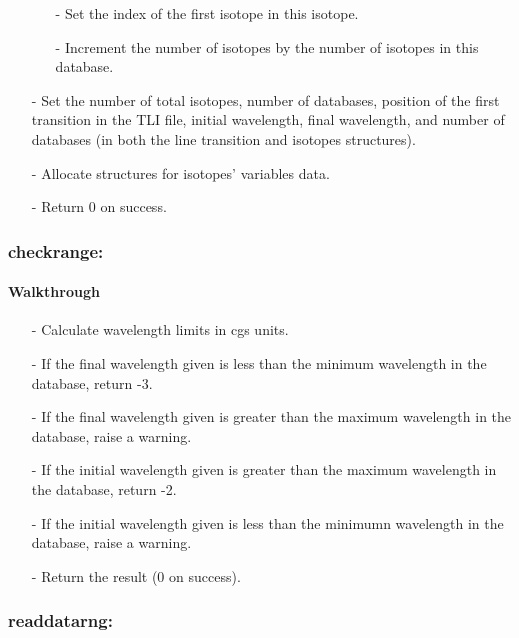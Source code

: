 \documentclass[letterpaper,12pt]{article}
\begin{document}
\begin{enumerate}[leftmargin=10pt, noitemsep, parsep=0pt, topsep=0ex]
\begin{enumerate}[leftmargin=10pt, noitemsep, parsep=0pt, topsep=0ex]
\item[-] Set the index of the first isotope in this isotope.
\item[-] Increment the number of isotopes by the number of isotopes in this database.
\end{enumerate}
\item[-] Set the number of total isotopes, number of databases, position of the first transition in the TLI file, initial wavelength, final wavelength, and number of databases (in both the line transition and isotopes structures).
\item[-] Allocate structures for isotopes' variables data.
\item[-] Return 0 on success.
\end{enumerate}


\subsubsection{checkrange:}
\paragraph{Walkthrough}
\begin{enumerate}[leftmargin=10pt, noitemsep, parsep=0pt, topsep=0ex]
\item[-] Calculate wavelength limits in cgs units.
\item[-] If the final wavelength given is less than the minimum wavelength in the database, return -3.
\item[-] If the final wavelength given is greater than the maximum wavelength in the database, raise a warning.
\item[-] If the initial wavelength given is greater than the maximum wavelength in the database, return -2.
\item[-] If the initial wavelength given is less than the minimumn wavelength in the database, raise a warning.
\item[-] Return the result (0 on success).
\end{enumerate}

\subsubsection{readdatarng:}
\end{document}
